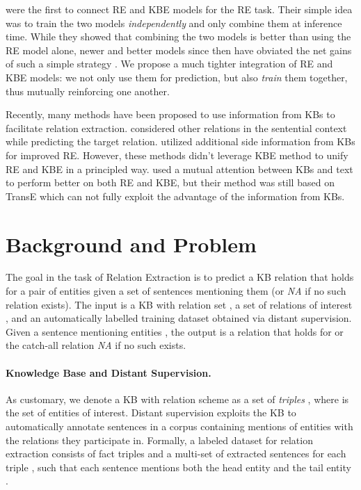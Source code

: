 \documentclass[11pt,a4paper]{article}
\begin{document}
\citet{weston2013connecting} were the first to connect RE and KBE models for the RE task. Their simple idea was to  train the two models \emph{independently} and only combine them at inference time.
While they showed that combining the two models is better than using the RE model alone, newer and better models since then have obviated the net gains of such a simple strategy \cite{xu2018investigations}. 
We propose a much tighter integration of RE and KBE models: we not only use them for prediction, but also \emph{train} them together, thus mutually reinforcing one another.


Recently, many methods have been proposed to use information from KBs to facilitate relation extraction.
 considered other relations in the sentential context while predicting the target relation.
 utilized additional side information from KBs for improved RE.
However, these methods didn't leverage KBE method to unify RE and KBE in a principled way.
 used a mutual attention between KBs and text to perform better on both RE and KBE, but their method was still based on TransE \cite{bordes2013translating} which can not fully exploit the advantage of the information from KBs.

%
 
\section{Background and Problem}


The goal in the task of Relation Extraction is to predict a KB relation that holds for a pair of entities given a set of sentences mentioning them (or \emph{NA} if no such relation exists).
The input is a KB  with relation set , a set of relations of interest , and an automatically labelled training dataset  obtained via distant supervision.
Given a sentence mentioning entities , the output is a relation  that holds for  or the catch-all relation {\em NA} if no such  exists.

\paragraph*{Knowledge Base and Distant Supervision.}

As customary, we denote a KB  with relation scheme  as a set of \emph{triples} , where  is the set of entities of interest.
Distant supervision exploits the KB to automatically annotate sentences in a corpus containing mentions of entities with the relations they participate in.
Formally, a labeled dataset for relation extraction consists of fact triples  and a multi-set of extracted sentences for each triple , such that
each sentence  mentions both the head entity  and the tail entity .
\end{document}

